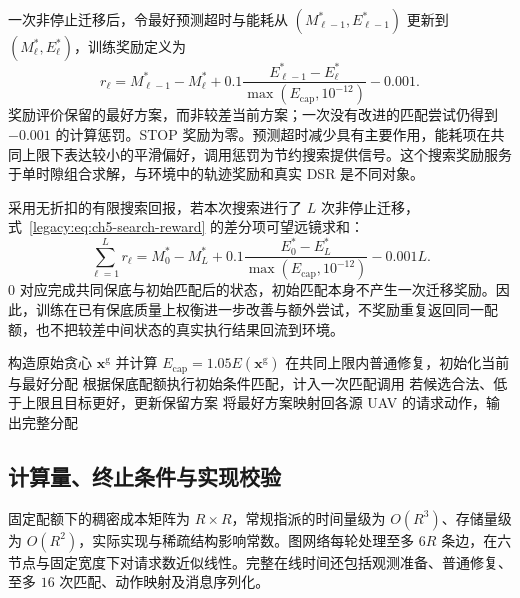 一次非停止迁移后，令最好预测超时与能耗从 $(M_{\ell-1}^{*},E_{\ell-1}^{*})$ 更新到 $(M_\ell^{*},E_\ell^{*})$，训练奖励定义为
\begin{equation}
 r_\ell=M_{\ell-1}^{*}-M_\ell^{*}
 +0.1\frac{E_{\ell-1}^{*}-E_\ell^{*}}{\max(E_{\mathrm{cap}},10^{-12})}-0.001.
 \label{legacy:eq:ch5-search-reward}
\end{equation}
奖励评价保留的最好方案，而非较差当前方案；一次没有改进的匹配尝试仍得到 $-0.001$ 的计算惩罚。STOP 奖励为零。预测超时减少具有主要作用，能耗项在共同上限下表达较小的平滑偏好，调用惩罚为节约搜索提供信号。这个搜索奖励服务于单时隙组合求解，与环境中的轨迹奖励和真实 DSR 是不同对象。

采用无折扣的有限搜索回报，若本次搜索进行了 $L$ 次非停止迁移，式~\eqref{legacy:eq:ch5-search-reward} 的差分项可望远镜求和：
\begin{equation}
 \sum_{\ell=1}^{L}r_\ell
 =M_0^*-M_L^*+0.1\frac{E_0^*-E_L^*}{\max(E_{\mathrm{cap}},10^{-12})}-0.001L.
 \label{legacy:eq:ch5-reward-telescope}
\end{equation}
$0$ 对应完成共同保底与初始匹配后的状态，初始匹配本身不产生一次迁移奖励。因此，训练在已有保底质量上权衡进一步改善与额外尝试，不奖励重复返回同一配额，也不把较差中间状态的真实执行结果回流到环境。

\begin{algorithm}[!htbp]
 \caption{SF-HLM 单时隙配额搜索与条件匹配}
 \label{legacy:alg:ch5-online}
 构造原始贪心 $\mathbf x^{\mathrm g}$ 并计算 $E_{\mathrm{cap}}=1.05E(\mathbf x^{\mathrm g})$\;
 在共同上限内普通修复，初始化当前与最好分配\;
 根据保底配额执行初始条件匹配，计入一次匹配调用\;
 若候选合法、低于上限且目标更好，更新保留方案\;
 将最好方案映射回各源 UAV 的请求动作，输出完整分配\;
\end{algorithm}

\subsection{计算量、终止条件与实现校验}

固定配额下的稠密成本矩阵为 $R\times R$，常规指派的时间量级为 $O(R^3)$、存储量级为 $O(R^2)$，实际实现与稀疏结构影响常数。图网络每轮处理至多 $6R$ 条边，在六节点与固定宽度下对请求数近似线性。完整在线时间还包括观测准备、普通修复、至多 $16$ 次匹配、动作映射及消息序列化。

